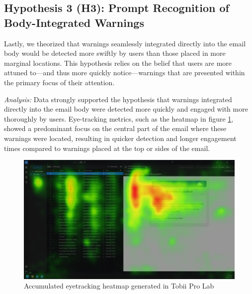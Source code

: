 \documentclass[
  a4paper,  %
  twoside,  %
  bibliography=totoc,
  headsepline,
  cleardoublepage=empty,
  parskip=half,
  draft=false
]{scrbook}
\begin{document}
\subsection{Hypothesis 3 (H3): Prompt Recognition of Body-Integrated Warnings}
Lastly, we theorized that warnings seamlessly integrated directly into the email body would be detected more swiftly by users than those placed in more marginal locations. This hypothesis relies on the belief that users are more attuned to—and thus more quickly notice—warnings that are presented within the primary focus of their attention. \par
\textit{Analysis:} Data strongly supported the hypothesis that warnings integrated directly into the email body were detected more quickly and engaged with more thoroughly by users. Eye-tracking metrics, such as the heatmap in figure \ref{fig:heatmap}, showed a predominant focus on the central part of the email where these warnings were located, resulting in quicker detection and longer engagement times compared to warnings placed at the top or sides of the email. 

\begin{figure} [ht]
    \centering
    \includegraphics[width=1\linewidth]{figures/heatmap_overlay.png}
    \caption{Accumulated eyetracking heatmap generated in Tobii Pro Lab}
    \label{fig:heatmap}
\end{figure}
\end{document}
